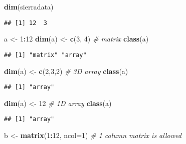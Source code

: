 \documentclass[
]{book}
\newenvironment{Shaded}{\begin{snugshade}}{\end{snugshade}}
\newcommand{\CommentTok}[1]{\textcolor[rgb]{0.56,0.35,0.01}{\textit{#1}}}
\newcommand{\DataTypeTok}[1]{\textcolor[rgb]{0.13,0.29,0.53}{#1}}
\newcommand{\DecValTok}[1]{\textcolor[rgb]{0.00,0.00,0.81}{#1}}
\newcommand{\KeywordTok}[1]{\textcolor[rgb]{0.13,0.29,0.53}{\textbf{#1}}}
\newcommand{\NormalTok}[1]{#1}
\newcommand{\OperatorTok}[1]{\textcolor[rgb]{0.81,0.36,0.00}{\textbf{#1}}}
\newcommand{\StringTok}[1]{\textcolor[rgb]{0.31,0.60,0.02}{#1}}
\begin{document}
\begin{Shaded}
\begin{Highlighting}[]
\KeywordTok{dim}\NormalTok{(sierradata)}
\end{Highlighting}
\end{Shaded}

\begin{verbatim}
## [1] 12  3
\end{verbatim}

\begin{Shaded}
\begin{Highlighting}[]
\NormalTok{a <-}\StringTok{ }\DecValTok{1}\OperatorTok{:}\DecValTok{12}
\KeywordTok{dim}\NormalTok{(a) <-}\StringTok{ }\KeywordTok{c}\NormalTok{(}\DecValTok{3}\NormalTok{, }\DecValTok{4}\NormalTok{)   }\CommentTok{# matrix}
\KeywordTok{class}\NormalTok{(a)}
\end{Highlighting}
\end{Shaded}

\begin{verbatim}
## [1] "matrix" "array"
\end{verbatim}

\begin{Shaded}
\begin{Highlighting}[]
\KeywordTok{dim}\NormalTok{(a) <-}\StringTok{ }\KeywordTok{c}\NormalTok{(}\DecValTok{2}\NormalTok{,}\DecValTok{3}\NormalTok{,}\DecValTok{2}\NormalTok{)  }\CommentTok{# 3D array}
\KeywordTok{class}\NormalTok{(a)}
\end{Highlighting}
\end{Shaded}

\begin{verbatim}
## [1] "array"
\end{verbatim}

\begin{Shaded}
\begin{Highlighting}[]
\KeywordTok{dim}\NormalTok{(a) <-}\StringTok{ }\DecValTok{12}        \CommentTok{# 1D array}
\KeywordTok{class}\NormalTok{(a)}
\end{Highlighting}
\end{Shaded}

\begin{verbatim}
## [1] "array"
\end{verbatim}

\begin{Shaded}
\begin{Highlighting}[]
\NormalTok{b <-}\StringTok{ }\KeywordTok{matrix}\NormalTok{(}\DecValTok{1}\OperatorTok{:}\DecValTok{12}\NormalTok{, }\DataTypeTok{ncol=}\DecValTok{1}\NormalTok{)  }\CommentTok{# 1 column matrix is allowed}
\end{Highlighting}
\end{Shaded}
\end{document}
